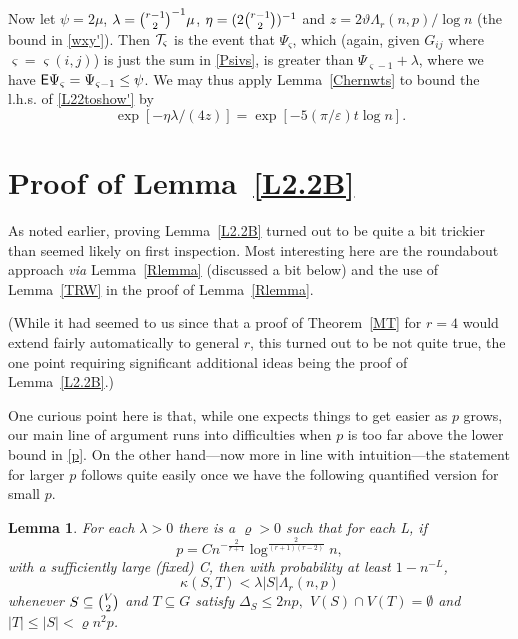 \documentclass[letterpaper,11pt]{article}
\newtheorem{lemma}[thm]{Lemma}
\newcommand{\beq}[1]{\begin{equation}\label{#1}}
\newcommand{\enq}[0]{\end{equation}}
\newcommand{\sub}[0]{\subseteq}
\newcommand{\T}[0]{{\cal T}}
\newcommand{\0}[0]{\emptyset}
\newcommand{\Cc}[0]{\tbinom}
\newcommand{\gD}[0]{\Delta }
\newcommand{\gl}[0]{\lambda }
\newcommand{\gL}[0]{\Lambda}
\newcommand{\eps}[0]{\varepsilon }
\newcommand{\vt}[0]{\vartheta}
\newcommand{\vs}[0]{\varsigma}
\newcommand{\vr}[0]{\varrho}
\newcommand{\glr}[0]{\gL_r(n,p)}
\begin{document}
Now
let $\psi=2\mu$,
$\gl =\Cc{r-1}{2}^{-1}\mu$,
$\eta =(2\Cc{r-1}{2})^{-1}$
and
$z= 2\vt \glr/\log n$
(the bound in \eqref{wxy'}).
Then
$\T_\vs$ is the event that $\Psi_\vs$, which
(again, given $G_{ij}$ where $\vs=\vs(i,j)$) is just the
sum in \eqref{Psivs}, is greater than $\Psi_{\vs-1}+\gl$,
where we have $\E\Psi_\vs =\Psi_{\vs-1}\leq \psi$.
%
We may thus apply Lemma~\ref{Chernwts}
to bound the l.h.s. of
\eqref{L22toshow'} by
\[\exp[-\eta\gl/(4z)]
=\exp[-5(\pi/\eps) t\log n].\]



\section{Proof of Lemma~\ref{L2.2B}}\label{PL2.2B}



As noted earlier, proving Lemma~\ref{L2.2B}
turned out to be quite a bit
trickier than seemed likely on first inspection.
Most interesting here are the roundabout approach
{\em via} Lemma~\ref{Rlemma} (discussed a bit below)
and the use of Lemma~\ref{TRW} in the proof of Lemma~\ref{Rlemma}.
\iffalse
Lemma~\ref{L2.2B} is, as noted earlier,
the most interesting of the auxiliary lemmas of
Section \ref{S2.2}, and has---to date---proved considerably
trickier than seemed likely on first inspection.
Most interesting here are the roundabout approach
{\em via} Lemma~\ref{Rlemma} (discussed a bit below)
and the use of Lemma~\ref{TRW} in the proof of Lemma~\ref{Rlemma}.
\fi
%
(While
it had seemed to us since \cite{DKMantel}
that a proof of Theorem~\ref{MT} for $r=4$
would extend fairly automatically to general $r$,
this turned out to be not quite true, the one point
requiring significant additional ideas being the proof of
Lemma~\ref{L2.2B}.)



One curious point here is that,
while one expects things to get easier as $p$ grows,
our main line of argument runs into difficulties
when $p$ is too far above the lower bound in \eqref{p}.
On the other hand---now more in line with intuition---the
statement for larger $p$ follows quite
easily once we have the following
quantified
version for small $p$.


\begin{lemma}\label{L2.2B'}
For each $\gl>0$ there is a $\vr>0$ such that
for each L, if
\beq{smallp}
p=Cn^{-\tfrac{2}{r+1}}\log^{\tfrac{2}{(r+1)(r-2)}}n,
\enq
with a sufficiently large (fixed) C, then
with probability at least $1-n^{-L}$,
\beq{kappaST'}
\kappa(S,T) < \gl|S|\glr
\enq
whenever
$S\sub \Cc{V}{2} $ and $T\sub G$ satisfy
$\gD_S\leq 2np,$ $V(S)\cap V(T) = \0$
and
$|T|\leq |S|<\vr n^2p$.
\end{lemma}
\end{document}

